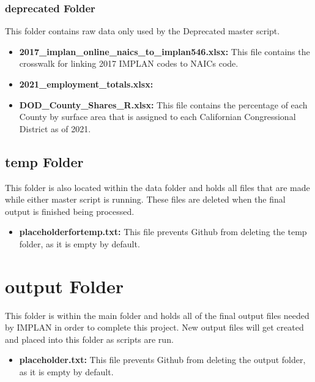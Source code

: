 \documentclass[
]{book}
\providecommand{\tightlist}{%
  \setlength{\itemsep}{0pt}\setlength{\parskip}{0pt}}
\begin{document}
\hypertarget{deprecated-folder}{%
\subsubsection{deprecated Folder}\label{deprecated-folder}}

This folder contains raw data only used by the Deprecated master script.

\begin{itemize}
\tightlist
\item
  \textbf{2017\_implan\_online\_naics\_to\_implan546.xlsx:} This file contains the crosswalk for linking 2017 IMPLAN codes to NAICs code.
\item
  \textbf{2021\_employment\_totals.xlsx:}
\item
  \textbf{DOD\_County\_Shares\_R.xlsx:} This file contains the percentage of each County by surface area that is assigned to each Californian Congressional District as of 2021.
\end{itemize}

\hypertarget{temp-folder}{%
\subsection{temp Folder}\label{temp-folder}}

This folder is also located within the data folder and holds all files that are made while either master script is running. These files are deleted when the final output is finished being processed.

\begin{itemize}
\tightlist
\item
  \textbf{placeholderfortemp.txt:} This file prevents Github from deleting the temp folder, as it is empty by default.
\end{itemize}

\hypertarget{output-folder}{%
\section{output Folder}\label{output-folder}}

This folder is within the main folder and holds all of the final output files needed by IMPLAN in order to complete this project. New output files will get created and placed into this folder as scripts are run.

\begin{itemize}
\tightlist
\item
  \textbf{placeholder.txt:} This file prevents Github from deleting the output folder, as it is empty by default.
\end{itemize}
\end{document}
